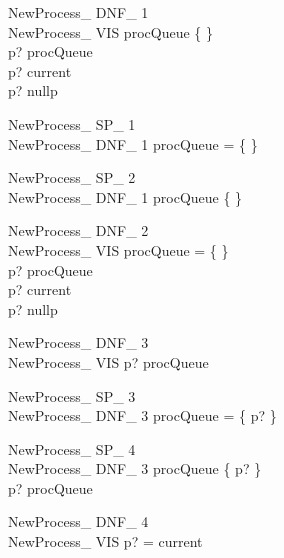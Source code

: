 \documentclass{article}
\begin{document}
\begin{multicols}{2}

\begin{schema}{NewProcess\_ DNF\_ 1}\\
NewProcess\_ VIS 
\where
procQueue \neq \{ \} \\
p? \notin \ran procQueue \\
p? \neq current \\
p? \neq nullp
\end{schema}

\begin{schema}{NewProcess\_ SP\_ 1}\\
NewProcess\_ DNF\_ 1 
\where
\ran procQueue = \{ \}
\end{schema}

\begin{schema}{NewProcess\_ SP\_ 2}\\
NewProcess\_ DNF\_ 1 
\where
\ran procQueue \neq \{ \}
\end{schema}

\begin{schema}{NewProcess\_ DNF\_ 2}\\
NewProcess\_ VIS 
\where
procQueue = \{ \} \\
p? \notin \ran procQueue \\
p? \neq current \\
p? \neq nullp
\end{schema}

\begin{schema}{NewProcess\_ DNF\_ 3}\\
NewProcess\_ VIS 
\where
p? \in \ran procQueue
\end{schema}

\begin{schema}{NewProcess\_ SP\_ 3}\\
NewProcess\_ DNF\_ 3 
\where
\ran procQueue = \{ p? \}
\end{schema}

\begin{schema}{NewProcess\_ SP\_ 4}\\
NewProcess\_ DNF\_ 3 
\where
\ran procQueue \neq \{ p? \} \\
p? \in \ran procQueue
\end{schema}

\begin{schema}{NewProcess\_ DNF\_ 4}\\
NewProcess\_ VIS 
\where
p? = current
\end{schema}


\end{multicols}
\end{document}
